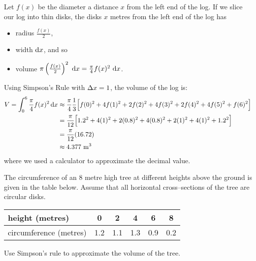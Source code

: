 \begin{solution}
 Let $f(x)$ be the diameter a distance $x$ from the left end of
the log.
If we slice our log into thin disks, the disks $x$ metres from the left end of the log has
\begin{itemize}
\item radius $\frac{f(x)}{2}$,
\item width $\mathrm{d}x$, and so
\item volume $\pi\left(\frac{f(x)}{2}\right)^2~\mathrm{d}x=\frac{\pi}{4}f(x)^2~\mathrm{d}x$.
\end{itemize}

\begin{center}
\end{center}

Using Simpson's Rule with $\Delta
x=1$,
the volume
of the log is:
\begin{align*}
V=\int_0^6 \frac{\pi}{4}f(x)^2\,\mathrm{d}x
&\approx\frac{\pi}{4}\frac{1}{3}
\Big[f(0)^2+4f(1)^2+2f(2)^2+4f(3)^2+2f(4)^2+4f(5)^2+f(6)^2\Big]\\
&=\frac{\pi}{12}
\Big[1.2^2+4(1)^2+2(0.8)^2+4(0.8)^2+2(1)^2+4(1)^2+1.2^2\Big]\\
&=\frac{\pi}{12}(16.72)\\
&\approx4.377\ {\rm m}^3
\end{align*}
where we used a calculator to approximate the decimal value.
\end{solution}

\begin{question}[1998A]
 The circumference of an 8 metre high tree at different heights
above the ground is given in the table below. Assume that all horizontal
cross--sections of the tree are circular disks.

\renewcommand{\arraystretch}{1.1}
\begin{center}
     \begin{tabular}{|l|c|c|c|c|c|}
          \hline
          height (metres) &0&2&4&6&8  \\
          \hline
          circumference (metres) &1.2&1.1&1.3&0.9&0.2\\
          \hline
     \end{tabular}
\end{center}
\renewcommand{\arraystretch}{1.0}

\noindent Use Simpson's rule to approximate the volume of the tree.
\end{question}

